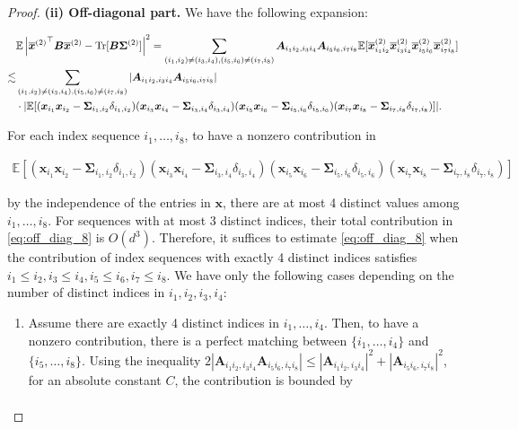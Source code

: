 \documentclass[10pt,a4paper]{amsart}
\newcommand{\E}{\mathbb{E}}
\newcommand{\Tr}{\operatorname{Tr}}
\def\bA{{\boldsymbol A}}
\def\bB{{\boldsymbol B}}
\def\bSigma{{\boldsymbol \Sigma}}
\def\bx{{\boldsymbol x}}
\begin{document}
\begin{proof}
\textbf{ (ii) Off-diagonal part.} We have the following expansion:
\begin{small}
\begin{align}
    &\E\left| {\overline\bx^{(2)}}^\top \bB\overline\bx^{(2)}-\Tr[\bB\bSigma^{(2)}]\right|^2 
    =\sum_{(i_1,i_2)\not=(i_3,i_4), (i_5,i_6)\not=(i_7,i_8)}\bA_{i_1i_2,i_3i_4}\bA_{i_5i_6,i_7i_8}\E[\overline\bx^{(2)}_{i_1i_2}\overline\bx^{(2)}_{i_3i_4}\overline\bx^{(2)}_{i_5i_6}\overline\bx^{(2)}_{i_7i_8}] \notag\\
    \lesssim & \sum_{(i_1,i_2)\not=(i_3,i_4), (i_5,i_6)\not=(i_7,i_8)} |\bA_{i_1i_2,i_3i_4}\bA_{i_5i_6,i_7i_8}|\label{eq:off_diag_8}\\
    &\cdot| \E[(\bx_{i_1}\bx_{i_2}-\bSigma_{i_1,i_2}\delta_{i_1,i_2})(\bx_{i_3}\bx_{i_4}-\bSigma_{i_3,i_4}\delta_{i_3,i_4})(\bx_{i_5}\bx_{i_6}-\bSigma_{i_5,i_6}\delta_{i_5,i_6})(\bx_{i_7}\bx_{i_8}-\bSigma_{i_7,i_8}\delta_{i_7,i_8})]|. 
\end{align}
\end{small}
For each index sequence $i_1,\dots, i_8$, to have a nonzero contribution in 
\begin{small}
\begin{align}\label{eq:i8}
\E[(\bx_{i_1}\bx_{i_2}-\bSigma_{i_1,i_2}\delta_{i_1,i_2})(\bx_{i_3}\bx_{i_4}-\bSigma_{i_3,i_4}\delta_{i_3,i_4})(\bx_{i_5}\bx_{i_6}-\bSigma_{i_5,i_6}\delta_{i_5,i_6})(\bx_{i_7}\bx_{i_8}-\bSigma_{i_7,i_8}\delta_{i_7,i_8})]
\end{align}
\end{small}
by the independence of the entries in $\bx$, there are at most 4 distinct values among $i_1,\dots, i_8$.  For sequences with at most 3 distinct indices, their total contribution in \eqref{eq:off_diag_8} is $O(d^3)$. Therefore, it suffices to estimate \eqref{eq:off_diag_8} when the contribution of index sequences with exactly 4 distinct indices satisfies $i_1\leq i_2,   i_3\leq i_4,  i_5\leq i_6,  i_7\leq i_8$. We have only the following cases depending on the number of distinct indices in $i_1,i_2,i_3,i_4$:
\begin{enumerate}
    \item Assume there are exactly 4 distinct indices in $i_1,\dots,i_4$. Then, to have a nonzero contribution, there is a perfect matching between $\{i_1,\dots, i_4\}$ and $\{i_5,\dots, i_8\}$. Using the inequality $2|\bA_{i_1i_2,i_3i_4}\bA_{i_5i_6,i_7i_8}|\leq |\bA_{i_1i_2,i_3i_4}|^2+|\bA_{i_5i_6,i_7i_8}|^2$, for an absolute constant $C$, the contribution is bounded by 
    \begin{align}

\end{align}
\end{enumerate}
\end{proof}
\end{document}
